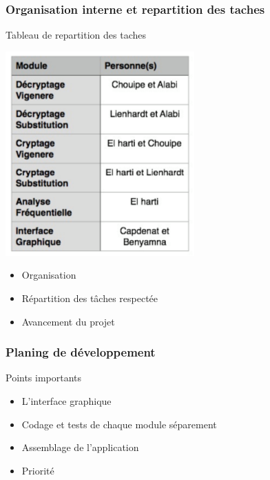 \documentclass[10pt,xcolor=table]{beamer}
\begin{document}
\begin{frame}
 \frametitle{Organisation interne et repartition des taches}
\begin{block}{Tableau de repartition des taches}
\begin{center}
\includegraphics[scale =0.47]{taches.png} \\ 
\end{center}
\begin{itemize}
\item Organisation\\ 
\item Répartition des tâches respectée\\  
\item Avancement du projet\\ 
\end{itemize}
\end{block}
\end{frame}



\begin{frame}
\frametitle{Planing de développement}
\begin{block}{Points importants}
\begin{itemize}
\item L'interface graphique\\ 
\item Codage et tests de chaque module séparement\\ 
\item Assemblage de l'application\\ 
\item Priorité\\ 
\end{itemize}
\end{block}
\end{frame}
\end{document}
